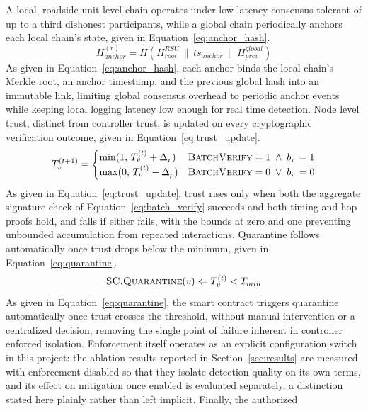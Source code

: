\documentclass[final,5p,twocolumn]{elsarticle}
\theoremstyle{remark}
\theoremstyle{plain}
\begin{document}
A local, roadside unit level chain operates under low latency consensus
tolerant of up to a third dishonest participants, while a global chain
periodically anchors each local chain's state, given in
Equation~\eqref{eq:anchor_hash}.
\begin{equation}
	H_{anchor}^{(r)} = H\!\left(H_{root}^{RSU} \,\|\, ts_{anchor} \,\|\, H_{prev}^{global}\right)
	\label{eq:anchor_hash}
\end{equation}
As given in Equation~\eqref{eq:anchor_hash}, each anchor binds the local
chain's Merkle root, an anchor timestamp, and the previous global hash into
an immutable link, limiting global consensus overhead to periodic anchor
events while keeping local logging latency low enough for real time
detection. Node level trust, distinct from controller trust, is updated on
every cryptographic verification outcome, given in
Equation~\eqref{eq:trust_update}.
\begin{equation}
	T_v^{(t+1)} =
	\begin{cases}
		\min(1,\, T_v^{(t)} + \Delta_r) & \textsc{BatchVerify} = 1 \;\land\; b_{\pi} = 1 \\
		\max(0,\, T_v^{(t)} - \Delta_p) & \textsc{BatchVerify} = 0 \;\lor\; b_{\pi} = 0
	\end{cases}
	\label{eq:trust_update}
\end{equation}
As given in Equation~\eqref{eq:trust_update}, trust rises only when both the
aggregate signature check of Equation~\eqref{eq:batch_verify} succeeds and
both timing and hop proofs hold, and falls if either fails, with the bounds
at zero and one preventing unbounded accumulation from repeated
interactions. Quarantine follows automatically once trust drops below the
minimum, given in Equation~\eqref{eq:quarantine}.
\begin{equation}
	\textsc{SC.Quarantine}(v) \Leftarrow T_v^{(t)} < T_{min}
	\label{eq:quarantine}
\end{equation}
As given in Equation~\eqref{eq:quarantine}, the smart contract triggers
quarantine automatically once trust crosses the threshold, without manual
intervention or a centralized decision, removing the single point of
failure inherent in controller enforced isolation. Enforcement itself
operates as an explicit configuration switch in this project: the ablation
results reported in Section~\ref{sec:results} are measured with enforcement
disabled so that they isolate detection quality on its own terms, and its
effect on mitigation once enabled is evaluated separately, a distinction
stated here plainly rather than left implicit. Finally, the authorized
\end{document}
